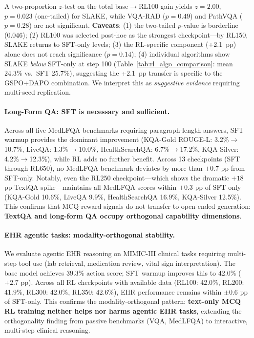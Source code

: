 \documentclass{article}
\begin{document}
A two-proportion $z$-test on the total base$\to$RL100 gain yields $z{=}2.00$, $p{=}0.023$ (one-tailed) for SLAKE, while VQA-RAD ($p{=}0.49$) and PathVQA ($p{=}0.28$) are not significant. \textbf{Caveats}: (1) the two-tailed $p$-value is borderline (0.046); (2) RL100 was selected post-hoc as the strongest checkpoint---by RL150, SLAKE returns to SFT-only levels; (3) the RL-specific component (+2.1~pp) alone does not reach significance ($p{=}0.14$); (4) individual algorithms show SLAKE \emph{below} SFT-only at step 100 (Table~\ref{tab:rl_algo_comparison}: mean 24.3\% vs.\ SFT 25.7\%), suggesting the +2.1~pp transfer is specific to the GSPO+DAPO combination. We interpret this as \emph{suggestive evidence} requiring multi-seed replication.

\paragraph{Long-Form QA: SFT is necessary and sufficient.} Across all five MedLFQA benchmarks requiring paragraph-length answers, SFT warmup provides the dominant improvement (KQA-Gold ROUGE-L: 3.2\%$\to$10.7\%, LiveQA: 1.3\%$\to$10.0\%, HealthSearchQA: 6.7\%$\to$17.2\%, KQA-Silver: 4.2\%$\to$12.3\%), while RL adds no further benefit. Across 13 checkpoints (SFT through RL650), no MedLFQA benchmark deviates by more than $\pm$0.7 pp from SFT-only. Notably, even the RL250 checkpoint---which shows the dramatic $+18$ pp TextQA spike---maintains all MedLFQA scores within $\pm$0.3 pp of SFT-only (KQA-Gold 10.6\%, LiveQA 9.9\%, HealthSearchQA 16.9\%, KQA-Silver 12.5\%). This confirms that MCQ reward signals do not transfer to open-ended generation: \textbf{TextQA and long-form QA occupy orthogonal capability dimensions}.

\paragraph{EHR agentic tasks: modality-orthogonal stability.} We evaluate agentic EHR reasoning on MIMIC-III clinical tasks requiring multi-step tool use (lab retrieval, medication review, vital sign interpretation). The base model achieves 39.3\% action score; SFT warmup improves this to 42.0\% ($+2.7$ pp). Across all RL checkpoints with available data (RL100: 42.0\%, RL200: 41.9\%, RL300: 42.0\%, RL350: 42.6\%), EHR performance remains within $\pm$0.6 pp of SFT-only. This confirms the modality-orthogonal pattern: \textbf{text-only MCQ RL training neither helps nor harms agentic EHR tasks}, extending the orthogonality finding from passive benchmarks (VQA, MedLFQA) to interactive, multi-step clinical reasoning.
\end{document}
